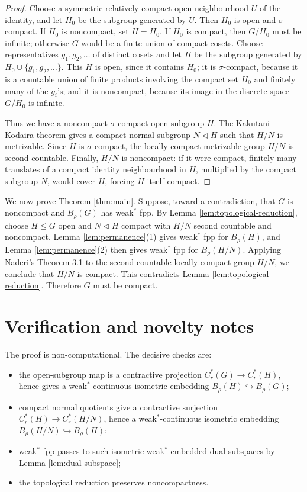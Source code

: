 \documentclass[11pt]{article}
\newcommand{\Br}{B_\rho}
\newcommand{\Cr}{C^*_r}
\begin{document}
\begin{proof}
Choose a symmetric relatively compact open neighbourhood \(U\) of the identity,
and let \(H_0\) be the subgroup generated by \(U\).  Then \(H_0\) is open and
\(\sigma\)-compact.  If \(H_0\) is noncompact, set \(H=H_0\).  If \(H_0\) is
compact, then \(G/H_0\) must be infinite; otherwise \(G\) would be a finite
union of compact cosets.  Choose representatives \(g_1,g_2,\ldots\) of
distinct cosets and let \(H\) be the subgroup generated by
\(H_0\cup\{g_1,g_2,\ldots\}\).  This \(H\) is open, since it contains \(H_0\);
it is \(\sigma\)-compact, because it is a countable union of finite products
involving the compact set \(H_0\) and finitely many of the \(g_i\)'s; and it is
noncompact, because its image in the discrete space \(G/H_0\) is infinite.

Thus we have a noncompact \(\sigma\)-compact open subgroup \(H\).  The
Kakutani--Kodaira theorem \cite[Theorem 8.7]{HewittRossI} gives a compact
normal subgroup \(N\triangleleft H\) such that \(H/N\) is metrizable.  Since
\(H\) is \(\sigma\)-compact, the locally compact metrizable group \(H/N\) is
second countable.  Finally, \(H/N\) is noncompact: if it were compact, finitely
many translates of a compact identity neighbourhood in \(H\), multiplied by
the compact subgroup \(N\), would cover \(H\), forcing \(H\) itself compact.
\end{proof}

We now prove Theorem \ref{thm:main}.  Suppose, toward a contradiction, that
\(G\) is noncompact and \(\Br(G)\) has weak\(^*\) fpp.  By Lemma
\ref{lem:topological-reduction}, choose \(H\leq G\) open and
\(N\triangleleft H\) compact with \(H/N\) second countable and noncompact.
Lemma \ref{lem:permanence}(1) gives weak\(^*\) fpp for \(\Br(H)\), and Lemma
\ref{lem:permanence}(2) then gives weak\(^*\) fpp for \(\Br(H/N)\).  Applying
Naderi's Theorem 3.1 \cite[Theorem 3.1]{Naderi1612} to the second countable
locally compact group \(H/N\), we conclude that \(H/N\) is compact.  This
contradicts Lemma \ref{lem:topological-reduction}.  Therefore \(G\) must be
compact.

\section*{Verification and novelty notes}

The proof is non-computational.  The decisive checks are:

\begin{itemize}
\item the open-subgroup map is a contractive projection
\(\Cr(G)\to\Cr(H)\), hence gives a weak\(^*\)-continuous isometric embedding
\(\Br(H)\hookrightarrow \Br(G)\);
\item compact normal quotients give a contractive surjection
\(\Cr(H)\to\Cr(H/N)\), hence a weak\(^*\)-continuous isometric embedding
\(\Br(H/N)\hookrightarrow \Br(H)\);
\item weak\(^*\) fpp passes to such isometric weak\(^*\)-embedded dual
subspaces by Lemma \ref{lem:dual-subspace};
\item the topological reduction preserves noncompactness.
\end{itemize}
\end{document}
